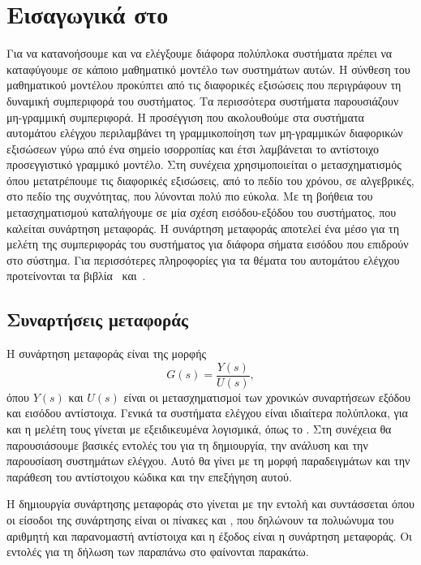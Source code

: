 \chapter{Εισαγωγικά στο }\label{ch:prelim}
Για να κατανοήσουμε και να ελέγξουμε διάφορα πολύπλοκα συστήματα πρέπει να
καταφύγουμε σε κάποιο μαθηματικό μοντέλο των συστημάτων αυτών. Η σύνθεση
του μαθηματικού μοντέλου προκύπτει από τις διαφορικές εξισώσεις που περιγράφουν
τη δυναμική συμπεριφορά του συστήματος. Τα περισσότερα συστήματα παρουσιάζουν
μη-γραμμική συμπεριφορά. Η προσέγγιση που ακολουθούμε στα συστήματα αυτομάτου
ελέγχου περιλαμβάνει τη γραμμικοποίηση των μη-γραμμικών διαφορικών εξισώσεων
γύρω από ένα σημείο ισορροπίας και έτσι λαμβάνεται το αντίστοιχο προσεγγιστικό
γραμμικό μοντέλο. Στη συνέχεια χρησιμοποιείται ο μετασχηματισμός 
όπου μετατρέπουμε τις διαφορικές εξισώσεις, από το πεδίο του χρόνου, σε
αλγεβρικές, στο πεδίο της συχνότητας, που λύνονται πολύ πιο εύκολα. Με τη
βοήθεια του μετασχηματισμού καταλήγουμε σε μία σχέση εισόδου-εξόδου
του συστήματος, που καλείται συνάρτηση μεταφοράς. Η συνάρτηση μεταφοράς αποτελεί
ένα μέσο για τη μελέτη της συμπεριφοράς του συστήματος για διάφορα σήματα
εισόδου που επιδρούν στο σύστημα. Για περισσότερες πληροφορίες για τα θέματα του
αυτομάτου ελέγχου προτείνονται τα βιβλία~\cite{dorf2011modern}
και~\cite{ogata2011modern}.

\section{Συναρτήσεις μεταφοράς}
Η συνάρτηση μεταφοράς είναι της μορφής
\[
    G(s) = \frac{Y(s)}{U(s)},
\]
όπου \( Y(s) \) και \( U(s) \) είναι οι μετασχηματισμοί  των
χρονικών συναρτήσεων εξόδου και εισόδου αντίστοιχα. Γενικά τα συστήματα ελέγχου
είναι ιδιαίτερα πολύπλοκα, για και η μελέτη τους γίνεται με εξειδικευμένα
λογισμικά, όπως το . Στη συνέχεια θα παρουσιάσουμε βασικές εντολές
του  για τη δημιουργία, την ανάλυση και την παρουσίαση συστημάτων
ελέγχου. Αυτό θα γίνει με τη μορφή παραδειγμάτων και την παράθεση του
αντίστοιχου κώδικα και την επεξήγηση αυτού.

Η δημιουργία συνάρτησης μεταφοράς στο  γίνεται με την εντολή
 και συντάσσεται
όπου οι είσοδοι της συνάρτησης είναι οι πίνακες  και , που
δηλώνουν τα πολυώνυμα του αριθμητή και παρανομαστή αντίστοιχα και η έξοδος
 είναι η συνάρτηση μεταφοράς. Οι εντολές για τη δήλωση των παραπάνω
στο  φαίνονται παρακάτω.
\eng{}

